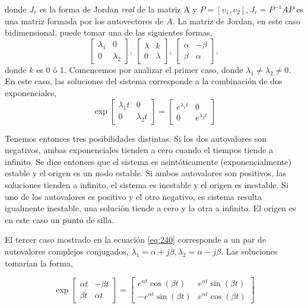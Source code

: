 donde  $J_r$ es la forma de Jordan \emph{real} de la matriz A y $P=[v_1,v_2]$,$\ J_r=P^{-1}AP$ es una matriz formada por los autovectores de $A$. La matriz de Jordan, en este caso bidimensional, puede tomar una de las siguientes formas,
\begin{equation}\label{eq:240}
\begin{bmatrix}
\lambda_1 & 0\\ 0 & \lambda_2
\end{bmatrix},\ \begin{bmatrix}
\lambda & k\\ 0 & \lambda
\end{bmatrix},\ \begin{bmatrix}
\alpha & -\beta\\ \beta & \alpha
\end{bmatrix},
\end{equation}
donde $k$ es 0 ó 1.
Comencemos por analizar el primer caso, donde $\lambda_1 \ne \lambda_2 \ne 0$. En este caso, las soluciones del sistema corresponde a la combinación de dos exponenciales,
\begin{equation}
\exp\begin{bmatrix}
\lambda_1t &0 \\
0& \lambda_2t
\end{bmatrix}=\begin{bmatrix}
e^{\lambda_1t} &0 \\
0& e^{\lambda_2t} 
\end{bmatrix}
\end{equation}



Tenemos entonces tres posibilidades distintas. Si los dos autovalores son negativos, ambas exponenciales tienden a cero cuando el tiempos tiende a infinito. Se dice entonces que el sistema es asintóticamente (exponencialmente) estable y el origen es un nodo estable. Si ambos autovalores son positivos, las soluciones tienden a infinito, el sistema es inestable y el origen es  inestable. Si uno de los autovalores es positivo y el otro negativo, es sistema resulta igualmente inestable, una solución tiende a cero y la otra a infinito. El origen es en este caso un punto de silla.

El tercer caso mostrado en la ecuación \ref{eq:240} corresponde a un par de autovalores complejos conjugados,
$\lambda_1 = \alpha + j \beta, \lambda_2 =\alpha -j\beta$.  Las soluciones tomarían la forma,

\begin{equation}
\exp\begin{bmatrix}
\alpha t & -\beta t\\ \beta t & \alpha t
\end{bmatrix} = 
\begin{bmatrix}
e^{\alpha t}\cos(\beta t) & e^{\alpha t}\sin(\beta t)\\
-e^{\alpha t}\sin(\beta t) & e^{\alpha t}\cos(\beta t)
\end{bmatrix}
\end{equation}

